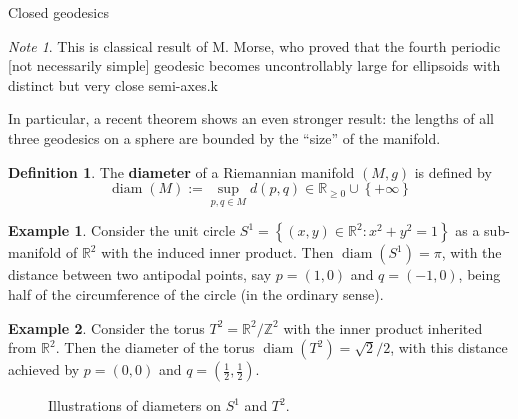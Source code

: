 \documentclass{article}
\newcommand{\set}[1]{\left\{#1\right\}}
\theoremstyle{definition}
\newtheorem{definition}{Definition}[section]
\newtheorem{example}{Example}[section]
\theoremstyle{remark}
\newtheorem{remark}{Note}[section]
\begin{document}
\begin{section}{Closed geodesics}
  \begin{remark} %
    This is classical result of M. Morse, who proved that the fourth periodic
    [not necessarily simple] geodesic becomes uncontrollably large for
    ellipsoids with distinct but very close semi-axes.k
  \end{remark}
  In particular, a recent theorem shows an even stronger result: the
  lengths of all three geodesics on a sphere are bounded by the ``size'' of
  the manifold.
  \begin{definition} %
    The \textbf{diameter} of a Riemannian manifold $(M, g)$ is defined by \[
      \operatorname{diam}(M) := \sup_{p, q\in M} d(p, q) \in \mathbb R_{\geq 0} \cup \set{+\infty}
    \]
  \end{definition}
  \begin{example} %
    Consider the unit circle $S^1 = \set{(x, y) \in \mathbb R^2 : x^2 + y^2 = 1}$
    as a sub-manifold of $\mathbb R^2$ with the induced inner product.
    Then $\operatorname{diam}(S^1) = \pi$, with the distance between two antipodal
    points, say $p = (1, 0)$ and $q = (-1, 0)$, being half of the circumference
    of the circle (in the ordinary sense).
  \end{example}
  \begin{example} %
    Consider the torus $T^2 = \mathbb R^2/\mathbb Z^2$ with the inner product
    inherited from $\mathbb R^2$. Then the diameter of the torus
    $\operatorname{diam}(T^2) = \sqrt{2}/2$, with this distance achieved by
    $p = (0, 0)$ and $q = (\frac 12, \frac 12)$.
  \end{example}
  \begin{figure}[ht]
    
    \caption{Illustrations of diameters on $S^1$ and $T^2$.}
  \end{figure}


\end{section}
\end{document}
